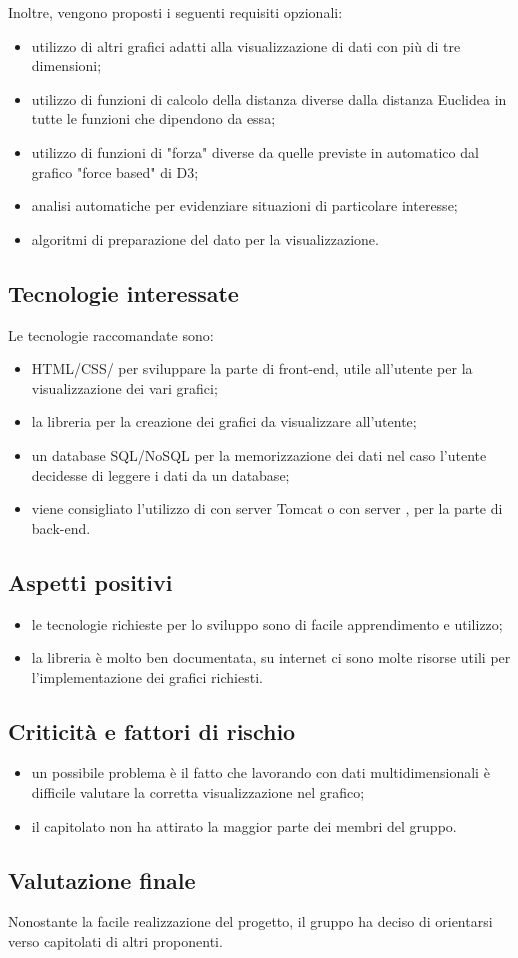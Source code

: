 Inoltre, vengono proposti i seguenti requisiti opzionali:
\begin{itemize}
\item utilizzo di altri grafici adatti alla visualizzazione di dati con più di tre dimensioni;
\item utilizzo di funzioni di calcolo della distanza diverse dalla distanza Euclidea in tutte le funzioni che dipendono da essa;
\item utilizzo di funzioni di "forza" diverse da quelle previste in automatico dal grafico "force based" di D3;
\item analisi automatiche per evidenziare situazioni di particolare interesse;
\item algoritmi di preparazione del dato per la visualizzazione.
\end{itemize}

\subsection{Tecnologie interessate}
Le tecnologie raccomandate sono:
\begin{itemize}
\item HTML/CSS/ per sviluppare la parte di front-end, utile all'utente per la visualizzazione dei vari grafici;
\item la libreria   per la creazione dei grafici da visualizzare all'utente;
\item un database SQL/NoSQL per la memorizzazione dei dati nel caso l'utente decidesse di leggere i dati da un database;
\item viene consigliato l’utilizzo di  con server Tomcat o  con server , per la parte di back-end.
\end{itemize}

\subsection{Aspetti positivi}
\begin{itemize}
\item le tecnologie richieste per lo sviluppo sono di facile apprendimento e utilizzo;
\item la libreria   è molto ben documentata, su internet ci sono molte risorse utili per l'implementazione dei grafici richiesti.
\end{itemize}

\subsection{Criticità e fattori di rischio}
\begin{itemize}
\item un possibile problema è il fatto che lavorando con dati multidimensionali è difficile valutare la corretta visualizzazione nel grafico;
\item il capitolato non ha attirato la maggior parte dei membri del gruppo.
\end{itemize}

\subsection{Valutazione finale}
Nonostante la facile realizzazione del progetto, il gruppo ha deciso di orientarsi verso capitolati di altri proponenti.